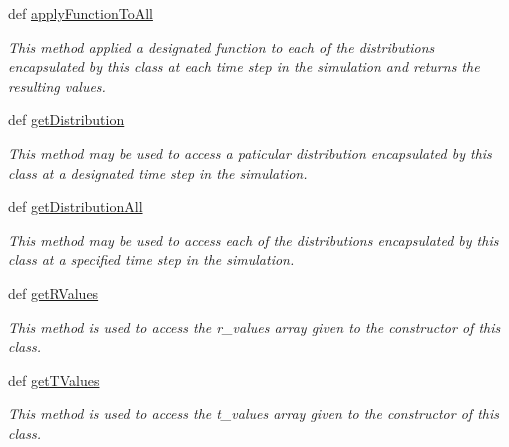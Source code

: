 \begin{DoxyCompactItemize}
def \hyperlink{class_distribution_data_processor_1_1_distribution_data_processor_a6215ea1385e09cad2781f0918d07e792}{applyFunctionToAll}
\begin{DoxyCompactList}\small\item\em This method applied a designated function to each of the distributions encapsulated by this class at each time step in the simulation and returns the resulting values. \item\end{DoxyCompactList}\item 
def \hyperlink{class_distribution_data_processor_1_1_distribution_data_processor_ad02c165755e21331ea2988166c12319c}{getDistribution}
\begin{DoxyCompactList}\small\item\em This method may be used to access a paticular distribution encapsulated by this class at a designated time step in the simulation. \item\end{DoxyCompactList}\item 
def \hyperlink{class_distribution_data_processor_1_1_distribution_data_processor_ae310e53613ab2830e7edaace7572fb7d}{getDistributionAll}
\begin{DoxyCompactList}\small\item\em This method may be used to access each of the distributions encapsulated by this class at a specified time step in the simulation. \item\end{DoxyCompactList}\item 
def \hyperlink{class_distribution_data_processor_1_1_distribution_data_processor_a28fad03c7b80716d1e978a9d807c6d87}{getRValues}
\begin{DoxyCompactList}\small\item\em This method is used to access the r\_\-values array given to the constructor of this class. \item\end{DoxyCompactList}\item 
def \hyperlink{class_distribution_data_processor_1_1_distribution_data_processor_a26729ea141c5ddcb97ab11026bf4cefd}{getTValues}
\begin{DoxyCompactList}\small\item\em This method is used to access the t\_\-values array given to the constructor of this class. \item\end{DoxyCompactList}\end{DoxyCompactItemize}


